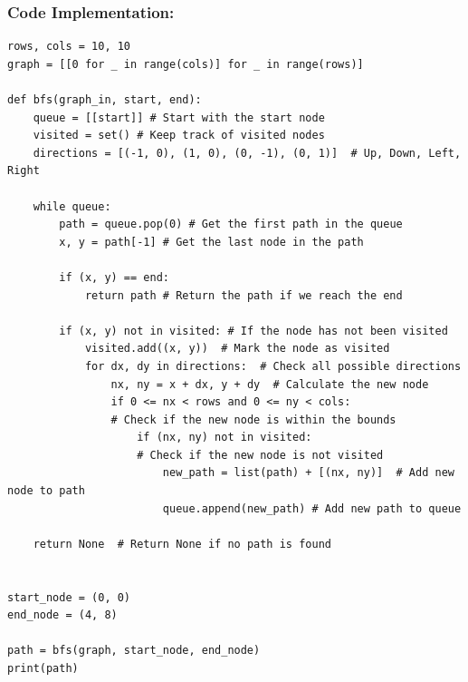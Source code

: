 \newpage

\subsubsection{Code Implementation:}
\begin{verbatim}
rows, cols = 10, 10
graph = [[0 for _ in range(cols)] for _ in range(rows)]

def bfs(graph_in, start, end):
    queue = [[start]] # Start with the start node
    visited = set() # Keep track of visited nodes
    directions = [(-1, 0), (1, 0), (0, -1), (0, 1)]  # Up, Down, Left, Right

    while queue:
        path = queue.pop(0) # Get the first path in the queue
        x, y = path[-1] # Get the last node in the path

        if (x, y) == end:
            return path # Return the path if we reach the end

        if (x, y) not in visited: # If the node has not been visited
            visited.add((x, y))  # Mark the node as visited
            for dx, dy in directions:  # Check all possible directions
                nx, ny = x + dx, y + dy  # Calculate the new node
                if 0 <= nx < rows and 0 <= ny < cols:  
                # Check if the new node is within the bounds
                    if (nx, ny) not in visited: 
                    # Check if the new node is not visited
                        new_path = list(path) + [(nx, ny)]  # Add new node to path
                        queue.append(new_path) # Add new path to queue

    return None  # Return None if no path is found


start_node = (0, 0)
end_node = (4, 8)

path = bfs(graph, start_node, end_node)
print(path)

\end{verbatim}

\newpage

